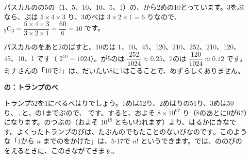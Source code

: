 パスカルのの5の（1、5、10、10、5、1）の、から2めの10とっています。3をぶなら、ぶは $5\times4\times3$ り、3のべは $3\times2\times1=6$ りなので、${}_5\mathrm{C}_3=\dfrac{5\times4\times3}{3\times2\times1}=\dfrac{60}{6}=10$ です。

パスカルのをあと2のばすと、10のは 1、10、45、120、210、252、210、120、45、10、1 です（ $2^{10}=1024$）。が5のは $\dfrac{252}{1024}\approx0.25$、7のは $\dfrac{120}{1024}\approx0.12$ です。ミナさんの「10で7」は、だいたい8に1はこることで、めずらしくありません。

\noindent\begin{minipage}{\linewidth}\begin{motto}[3]
\textbf{の：トランプのべ}\par
トランプ52を1にべるべはりでしょう。1めは52り、2めはりの51り、3めは50り、…と、の1までぶので、
です。すると、およそ $8\times10^{67}$ り（8のあとに0が67）になります。のつぶの（およそ $10^{19}$ ともいわれます）より、はるかにきなです。よくったトランプのびは、たぶんのでもたことのないびなのです。このような「1から $n$ までのをかけた」は、5-17で $n!$ というできます。では、ののびのをえるときに、このきながてきます。
\end{motto}
\end{minipage}




